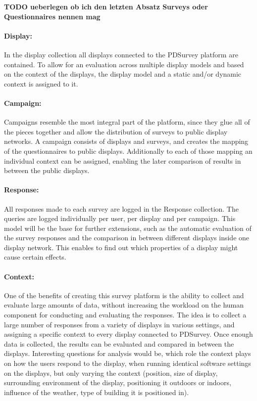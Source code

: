 	\textbf{TODO ueberlegen ob ich den letzten Absatz Surveys oder Questionnaires nennen mag}


	\paragraph{Display:} In the display collection all displays connected to the PDSurvey platform are contained. To allow for an evaluation across multiple display models and based on the context of the displays, the display model and a static and/or dynamic context is assigned to it.

	\paragraph{Campaign:} Campaigns resemble the most integral part of the platform, since they glue all of the pieces together and allow the distribution of surveys to public display networks. A campaign consists of displays and surveys, and creates the mapping of the questionnaires to public displays. Additionally to each of those mapping an individual context can be assigned, enabling the later comparison of results in between the public displays.

	\paragraph{Response:} All responses made to each survey are logged in the Response collection. The queries are logged individually per user, per display and per campaign. This model will be the base for further extensions, such as the automatic evaluation of the survey responses and the comparison in between different displays inside one display network. This enables to find out which properties of a display might cause certain effects.

	\paragraph{Context:} One of the benefits of creating this survey platform is the ability to collect and evaluate large amounts of data, without increasing the workload on the human component for conducting and evaluating the responses. The idea is to collect a large number of responses from a variety of displays in various settings, and assigning a specific context to every display connected to PDSurvey. Once enough data is collected, the results can be evaluated and compared in between the displays. Interesting questions for analysis would be, which role the context plays on how the users respond to the display, when running identical software settings on the displays, but only varying the context (position, size of display, surrounding environment of the display, positioning it outdoors or indoors, influence of the weather, type of building it is positioned in).



